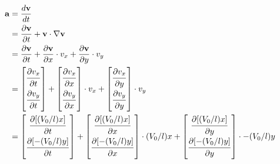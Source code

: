 \documentclass{article}
\begin{document}
\begin{align*}
    \mathbf{a} &= \frac{d\mathbf{v}}{dt} \\
    &= \frac{\partial\mathbf{v}}{\partial t} + \mathbf{v} \cdot \nabla \mathbf{v} \\
    &= \frac{\partial\mathbf{v}}{\partial t} + \frac{\partial\mathbf{v}}{\partial x} \cdot v_x + \frac{\partial\mathbf{v}}{\partial y} \cdot v_y \\
    &= \begin{bmatrix}
        \dfrac{\strut\partial v_x}{\strut\partial t}
        \\
        \dfrac{\strut\partial v_y}{\strut\partial t}
       \end{bmatrix}
       +
       \begin{bmatrix}
        \dfrac{\strut\partial v_x}{\strut\partial x}
        \\
        \dfrac{\strut\partial v_y}{\strut\partial x}
       \end{bmatrix} \cdot v_x
       +
       \begin{bmatrix}
        \dfrac{\strut\partial v_x}{\strut\partial y}
        \\
        \dfrac{\strut\partial v_y}{\strut\partial y}
       \end{bmatrix} \cdot v_y
       \\
    &= \begin{bmatrix}
        \dfrac{\strut\partial [(V_0 / l)x]}{\strut\partial t}
        \\
        \dfrac{\strut\partial [-(V_0 / l)y]}{\strut\partial t}
       \end{bmatrix}
       +
       \begin{bmatrix}
        \dfrac{\strut\partial [(V_0 / l)x]}{\strut\partial x}
        \\
        \dfrac{\strut\partial [-(V_0 / l)y]}{\strut\partial x}
       \end{bmatrix} \cdot (V_0 / l)x
       +
       \begin{bmatrix}
        \dfrac{\strut\partial [(V_0 / l)x]}{\strut\partial y}
        \\
        \dfrac{\strut\partial [-(V_0 / l)y]}{\strut\partial y}
       \end{bmatrix} \cdot -(V_0 / l)y
       \\

\end{align*}
\end{document}
